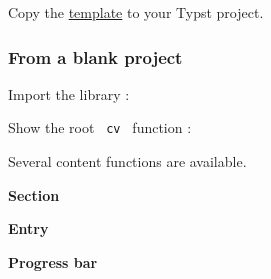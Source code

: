 Copy the
\href{https://raw.githubusercontent.com/lelimacon/typst-minimal-cv/main/template/cv.typ}{template}
to your Typst project.

\subsubsection{From a blank project}\label{from-a-blank-project}

Import the library :

\begin{Shaded}
\begin{Highlighting}[]
\end{Highlighting}
\end{Shaded}

Show the root \texttt{\ cv\ } function :

\begin{Shaded}
\begin{Highlighting}[]
\NormalTok{  aside: [}
\NormalTok{  ]}

\end{Highlighting}
\end{Shaded}

Several content functions are available.

\textbf{Section}

\begin{Shaded}
\begin{Highlighting}[]
\NormalTok{)}
\end{Highlighting}
\end{Shaded}

\textbf{Entry}

\begin{Shaded}
\begin{Highlighting}[]

\NormalTok{)}
\end{Highlighting}
\end{Shaded}

\textbf{Progress bar}


